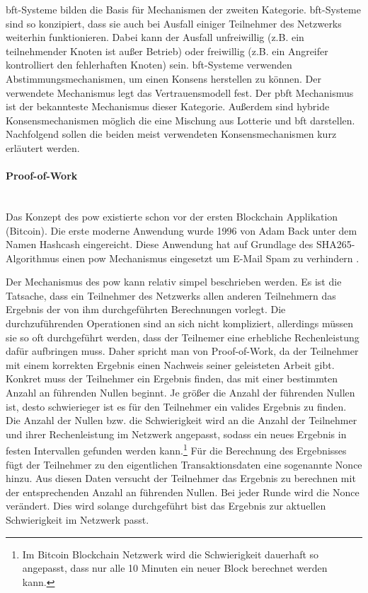 \acf{bft}-Systeme bilden die Basis für Mechanismen der zweiten Kategorie. \ac{bft}-Systeme sind so konzipiert, dass sie auch bei Ausfall einiger Teilnehmer des Netzwerks weiterhin funktionieren. Dabei kann der Ausfall unfreiwillig (z.B. ein teilnehmender Knoten ist außer Betrieb) oder freiwillig (z.B. ein Angreifer kontrolliert den fehlerhaften Knoten) sein. \ac{bft}-Systeme verwenden Abstimmungsmechanismen, um einen Konsens herstellen zu können. Der verwendete Mechanismus legt das Vertrauensmodell fest. Der \acf{pbft} Mechanismus ist der bekannteste Mechanismus dieser Kategorie.
Außerdem sind hybride Konsensmechanismen möglich die eine Mischung aus Lotterie und \ac{bft} darstellen. Nachfolgend sollen die beiden meist verwendeten Konsensmechanismen kurz erläutert werden.

\paragraph{Proof-of-Work}$~~$\\
Das Konzept des \acf{pow} existierte schon vor der ersten Blockchain Applikation (Bitcoin). Die erste moderne Anwendung wurde 1996 von Adam Back unter dem Namen \glqq Hashcash\grqq{} eingereicht. Diese Anwendung hat auf Grundlage des SHA265-Algorithmus einen \ac{pow} Mechanismus eingesetzt um E-Mail Spam zu verhindern \citep{Back2002}.

Der Mechanismus des \ac{pow} kann relativ simpel beschrieben werden. Es ist die Tatsache, dass ein Teilnehmer des Netzwerks allen anderen Teilnehmern das Ergebnis der von ihm durchgeführten Berechnungen vorlegt. Die durchzuführenden Operationen sind an sich nicht kompliziert, allerdings müssen sie so oft durchgeführt werden, dass der Teilnemer eine erhebliche Rechenleistung dafür aufbringen muss. Daher spricht man von \glqq Proof-of-Work\grqq{}, da der Teilnehmer mit einem korrekten Ergebnis einen Nachweis seiner geleisteten Arbeit gibt. Konkret muss der Teilnehmer ein Ergebnis finden, das mit einer  bestimmten Anzahl an führenden Nullen beginnt. Je größer die Anzahl der führenden Nullen ist, desto schwierieger ist es für den Teilnehmer ein valides Ergebnis zu finden. Die Anzahl der Nullen bzw. die Schwierigkeit wird an die Anzahl der Teilnehmer und ihrer Rechenleistung im Netzwerk angepasst, sodass ein neues Ergebnis in festen Intervallen gefunden werden kann.\footnote{Im Bitcoin Blockchain Netzwerk wird die Schwierigkeit dauerhaft so angepasst, dass nur alle 10 Minuten ein neuer Block berechnet werden kann.} Für die Berechnung des Ergebnisses fügt der Teilnehmer zu den eigentlichen Transaktionsdaten eine sogenannte \glqq Nonce\grqq{} hinzu. Aus diesen Daten versucht der Teilnehmer das Ergebnis zu berechnen mit der entsprechenden Anzahl an führenden Nullen. Bei jeder Runde wird die \glqq Nonce\grqq{} verändert. Dies wird solange durchgeführt bist das Ergebnis zur aktuellen Schwierigkeit im Netzwerk passt.

